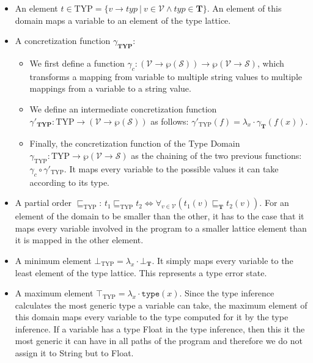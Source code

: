 \documentclass[10pt]{report}
\begin{document}
\begin{itemize}
	\item An element $ t \in \mathrm{TYP} = \lbrace v \rightarrow typ\ \vert\ v \in \mathcal{V} \wedge typ \in \mathbf{T}  \rbrace $. An element of this domain maps a variable to an element of the type lattice. 
	\item A concretization function $ \gamma_{\mathbf{TYP}} $:
	\begin{itemize} 
		\item We first define a function $ \gamma_{c}: (\mathcal{V} \rightarrow \wp(\mathcal{S})) \longrightarrow \wp(\mathcal{V} \rightarrow \mathcal{S}) $, which transforms a mapping from variable to multiple string values to multiple mappings from a variable to a string value. 
		\item We define an intermediate concretization function $ \gamma'_{\mathbf{TYP}}: \mathrm{TYP} \longrightarrow (\mathcal{V} \rightarrow \wp(\mathcal{S})) $ as follows: $ \gamma'_{\mathrm{TYP}}(f) = \lambda_{x}\cdot \gamma_{\mathbf{T}}(f(x)) $. 
		\item Finally, the concretization function of the Type Domain $ \gamma_{\mathrm{TYP}}: \mathrm{TYP} \longrightarrow \wp(\mathcal{V} \rightarrow \mathcal{S}) $ as the chaining of the two previous functions: $ \gamma_{c} \circ \gamma'_{\mathrm{TYP}}$. It maps every variable to the possible values it can take according to its type. 
	\end{itemize}

\item A partial order $ \sqsubseteq_{\mathrm{TYP}} $: $ t_{1} \sqsubseteq_{\mathrm{TYP}} t_{2} \Longleftrightarrow \forall_{v \in \mathcal{V}} (t_{1}(v) \sqsubseteq_{\mathbf{T}} t_{2}(v))$. For an element of the domain to be smaller than the other, it has to the case that it maps every variable involved in the program to a smaller lattice element than it is mapped in the other element. 


\item A minimum element $ \bot_{\mathrm{TYP}} = \lambda_{x} \cdot \bot_{\mathbf{T}}$. It simply maps every variable to the least element of the type lattice. This represents a type error state. 

\item A maximum element $ \top_{\mathrm{TYP}} = \lambda_{x} \cdot \mathtt{type}(x) $. Since the type inference calculates the most generic type a variable can take, the maximum element of this domain maps every variable to the type computed for it by the type inference. If a variable has a type Float in the type inference, then this it the most generic it can have in all paths of the program and therefore we do not assign it to String but to Float. 


\end{itemize}
\end{document}
